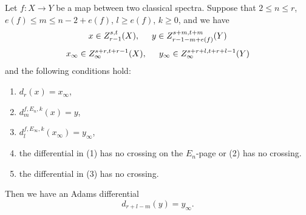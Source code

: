 \begin{theorem}\label{thm:gen-leibniz-k}
    Let $f: X\to Y$ be a map between two classical spectra.
    Suppose that $2\le n\le r$, $e(f)\le m\le n-2+e(f)$, $l\ge e(f)$, $k\ge 0$, and we have
    $$x\in Z_{r-1}^{s,t}(X), \hspace{0.5cm} y\in Z_{r-1-m+e(f)}^{s+m,t+m}(Y)$$
    $$x_\infty\in Z_\infty^{s+r,t+r-1}(X), \hspace{0.5cm} y_\infty\in Z_\infty^{s+r+l,t+r+l-1}(Y)$$
    and the following conditions hold:
    \begin{enumerate}
        \item $d_{r}(x)=x_\infty$,
        \item $d_{m}^{f,E_n, k}(x)=y$,
        \item $d_{l}^{f,E_\infty, k}(x_\infty)=y_\infty$,
        \item the differential in (1) has no crossing on the $E_n$-page or (2) has no crossing.
        \item the differential in (3) has no crossing.
    \end{enumerate}
    Then we have an Adams differential
    $$d_{r+l-m}(y)= y_\infty.$$
\end{theorem}

